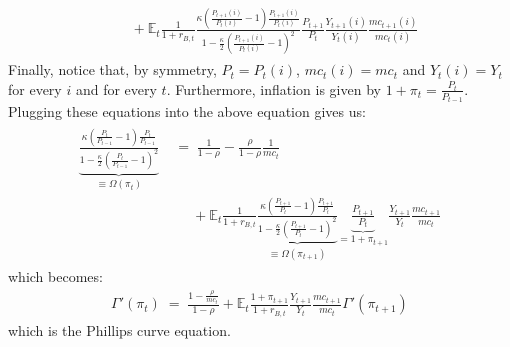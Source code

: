 \documentclass[a4paper, 12pt]{article}
\begin{document}
\begin{Answer}
\begin{align*}
\begin{split}
			& \; \quad + \mathbb{E}_t \frac{1}{1+r_{B,t}} \frac{\kappa\left( \frac{P_{t+1}(i)}{P_{t}(i)} - 1 \right) \frac{P_{t+1}(i)}{P_t(i)}}{1-\frac{\kappa}{2}\left(\frac{P_{t+1}(i)}{P_{t}(i)}-1\right)^2} \frac{P_{t+1}}{P_t} \frac{Y_{t+1}(i)}{Y_t(i)} \frac{mc_{t+1}(i)}{mc_t(i)}%
		\end{split}%
	\end{align*}%
	Finally, notice that, by symmetry, $P_t = P_t(i)$, $mc_t(i) = mc_t$ and $Y_t(i) = Y_t$ for every $i$ and for every $t$. Furthermore, inflation is given by $1+\pi_t = \frac{P_t}{P_{t-1}}$. Plugging these equations into the above equation gives us:%
	\begin{align*}%
		\begin{split}%
			\underbrace{\frac{\kappa \left( \frac{P_t}{P_{t-1}} - 1\right) \frac{P_t}{P_{t-1}}}{1-\frac{\kappa}{2}\left(\frac{P_t}{P_{t-1}}-1\right)^2}}_{\equiv \Omega(\pi_t)} \; &= \; \frac{1}{1-\rho} - \frac{\rho}{1-\rho} \frac{1}{mc_t} \\%
			& \; \quad + \mathbb{E}_t \frac{1}{1+r_{B,t}} \underbrace{\frac{\kappa\left( \frac{P_{t+1}}{P_{t}} - 1 \right) \frac{P_{t+1}}{P_t}}{1-\frac{\kappa}{2}\left(\frac{P_{t+1}}{P_{t}}-1\right)^2}}_{\equiv \Omega(\pi_{t+1})} \underbrace{\frac{P_{t+1}}{P_t}}_{= 1+\pi_{t+1}} \frac{Y_{t+1}}{Y_t} \frac{mc_{t+1}}{mc_t}%
		\end{split}%
	\end{align*}%
	which becomes:%
	\begin{align*}%
		\Gamma'(\pi_t) \; = \; \frac{1-\frac{\rho}{mc_t}}{1-\rho} + \mathbb{E}_t \frac{1 + \pi_{t+1}}{1+r_{B,t}} \frac{Y_{t+1}}{Y_t} \frac{mc_{t+1}}{mc_t} \Gamma'(\pi_{t+1})%
	\end{align*}%
	which is the Phillips curve equation.%
\end{Answer}%
\bigskip%
\end{document}
